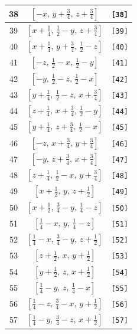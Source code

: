\documentclass[fleqn,8pt]{jsarticle}
\begin{document}
\begin{longtable}{ccc}
38 & $\left[ - x,\, y + \frac{3}{4},\, z + \frac{3}{4} \right]$ & {\tt [38]} \\ \hline
39 & $\left[ x + \frac{1}{4},\, \frac{1}{2} - y,\, z + \frac{3}{4} \right]$ & {\tt [39]} \\ \hline
40 & $\left[ x + \frac{1}{4},\, y + \frac{3}{4},\, \frac{1}{2} - z \right]$ & {\tt [40]} \\ \hline
41 & $\left[ - z,\, \frac{1}{2} - x,\, \frac{1}{2} - y \right]$ & {\tt [41]} \\ \hline
42 & $\left[ - y,\, \frac{1}{2} - z,\, \frac{1}{2} - x \right]$ & {\tt [42]} \\ \hline
43 & $\left[ y + \frac{1}{4},\, \frac{1}{2} - z,\, x + \frac{3}{4} \right]$ & {\tt [43]} \\ \hline
44 & $\left[ z + \frac{1}{4},\, x + \frac{3}{4},\, \frac{1}{2} - y \right]$ & {\tt [44]} \\ \hline
45 & $\left[ y + \frac{1}{4},\, z + \frac{3}{4},\, \frac{1}{2} - x \right]$ & {\tt [45]} \\ \hline
46 & $\left[ - z,\, x + \frac{3}{4},\, y + \frac{3}{4} \right]$ & {\tt [46]} \\ \hline
47 & $\left[ - y,\, z + \frac{3}{4},\, x + \frac{3}{4} \right]$ & {\tt [47]} \\ \hline
48 & $\left[ z + \frac{1}{4},\, \frac{1}{2} - x,\, y + \frac{3}{4} \right]$ & {\tt [48]} \\ \hline
49 & $\left[ x + \frac{1}{2},\, y,\, z + \frac{1}{2} \right]$ & {\tt [49]} \\ \hline
50 & $\left[ x + \frac{1}{2},\, \frac{3}{4} - y,\, \frac{1}{4} - z \right]$ & {\tt [50]} \\ \hline
51 & $\left[ \frac{1}{4} - x,\, y,\, \frac{1}{4} - z \right]$ & {\tt [51]} \\ \hline
52 & $\left[ \frac{1}{4} - x,\, \frac{3}{4} - y,\, z + \frac{1}{2} \right]$ & {\tt [52]} \\ \hline
53 & $\left[ z + \frac{1}{2},\, x,\, y + \frac{1}{2} \right]$ & {\tt [53]} \\ \hline
54 & $\left[ y + \frac{1}{2},\, z,\, x + \frac{1}{2} \right]$ & {\tt [54]} \\ \hline
55 & $\left[ \frac{1}{4} - y,\, z,\, \frac{1}{4} - x \right]$ & {\tt [55]} \\ \hline
56 & $\left[ \frac{1}{4} - z,\, \frac{3}{4} - x,\, y + \frac{1}{2} \right]$ & {\tt [56]} \\ \hline
57 & $\left[ \frac{1}{4} - y,\, \frac{3}{4} - z,\, x + \frac{1}{2} \right]$ & {\tt [57]} \\ \hline

\end{longtable}
\end{document}
